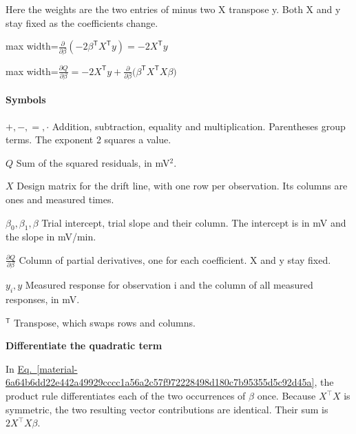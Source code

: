 \documentclass[11pt,a4paper]{article}
\begin{document}
Here the weights are the two entries of minus two X transpose y. Both X and y stay fixed as the coefficients change.
\begin{center}\begin{adjustbox}{max width=\linewidth}$\displaystyle \frac{\partial}{\partial\beta}(-2\beta^{\mathsf T}X^{\mathsf T}y)=-2X^{\mathsf T}y$\end{adjustbox}\end{center}


\begin{center}\begin{adjustbox}{max width=\linewidth}$\displaystyle \frac{\partial Q}{\partial\beta}=-2X^{\mathsf T}y+\frac{\partial}{\partial\beta}\bigl(\beta^{\mathsf T}X^{\mathsf T}X\beta\bigr)$\end{adjustbox}\end{center}

\paragraph{Symbols}
\par\noindent\textbf{\(+,-,=,\cdot\)} Addition, subtraction, equality and multiplication. Parentheses group terms. The exponent 2 squares a value.
\par\noindent\textbf{\(Q\)} Sum of the squared residuals, in mV\ensuremath{{}^2}.
\par\noindent\textbf{\(X\)} Design matrix for the drift line, with one row per observation. Its columns are ones and measured times.
\par\noindent\textbf{\(\beta_0,\beta_1,\beta\)} Trial intercept, trial slope and their column. The intercept is in mV and the slope in mV/min.
\par\noindent\textbf{\(\frac{\partial Q}{\partial\beta}\)} Column of partial derivatives, one for each coefficient. X and y stay fixed.
\par\noindent\textbf{\(y_i,y\)} Measured response for observation i and the column of all measured responses, in mV.
\par\noindent\textbf{\({}^{\mathsf T}\)} Transpose, which swaps rows and columns.
\medskip

\textbf{Differentiate the quadratic term}


In \hyperref[material-6a64b6dd22e442a49929cccc1a56a2c57f972228498d180c7b95355d5c92d45a]{Eq.~\ref*{material-6a64b6dd22e442a49929cccc1a56a2c57f972228498d180c7b95355d5c92d45a}}, the product rule differentiates each of the two occurrences of \(\beta\) once. Because \(X^\top X\) is symmetric, the two resulting vector contributions are identical. Their sum is \(2X^\top X\beta\).
\end{document}
